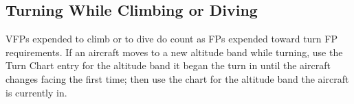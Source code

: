 

\subsection{Turning While Climbing or Diving}
VFPs expended to climb or to dive do count as FPs expended toward turn FP requirements. If an aircraft moves to a new altitude band while turning, use the Turn Chart entry for the altitude band it began the turn in until the aircraft changes facing the first time; then use the chart for the altitude band the aircraft is currently in.

